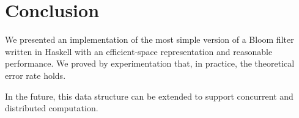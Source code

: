 \documentclass[12pt, a4paper]{article} %
\begin{document}
\section{Conclusion}\label{s:conclusion}

We presented an implementation of the most simple version of a Bloom filter written in Haskell with an efficient-space representation and reasonable performance. We proved by experimentation that, in practice, the theoretical error rate holds.

In the future, this data structure can be extended to support concurrent and distributed computation.



\end{document}
